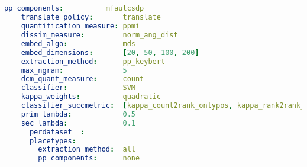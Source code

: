 
% 

\subsection{\textcite{Derrac2015}}

\begin{lstlisting}[language=yaml, caption={YAML for \textcite{Derrac2015}}]
    pp_components:          mfautcsdp
    translate_policy:       translate
    quantification_measure: ppmi
    dissim_measure:         norm_ang_dist
    embed_algo:             mds
    embed_dimensions:       [20, 50, 100, 200]
    extraction_method:      pp_keybert
    max_ngram:              5                   
    dcm_quant_measure:      count
    classifier:             SVM
    kappa_weights:          quadratic
    classifier_succmetric:  [kappa_count2rank_onlypos, kappa_rank2rank_onlypos_min] 
    prim_lambda:            0.5
    sec_lambda:             0.1
    __perdataset__:
      placetypes:
        extraction_method:  all 
        pp_components:      none
\end{lstlisting}

\subsection{\textcite{Ager2018}}







